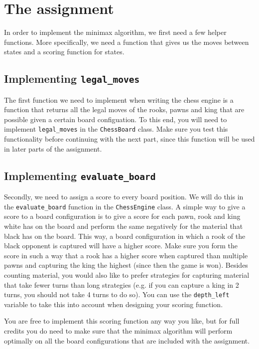\section*{The assignment}
In order to implement the minimax algorithm, we first need a few helper functions. More specifically, we need a function that gives us the moves between states and a scoring function for states.

\subsection{Implementing \texttt{legal\_moves}}
The first function we need to implement when writing the chess engine is a function that returns all the legal moves of the rooks, pawns and king that are possible given a certain board configuation. To this end, you will need to implement \texttt{legal\_moves} in the \texttt{ChessBoard} class. Make sure you test this functionality before continuing with the next part, since this function will be used in later parts of the assignment.

\subsection{Implementing \texttt{evaluate\_board}}
Secondly, we need to assign a score to every board position. We will do this in the \texttt{evaluate\_board} function in the \texttt{ChessEngine} class. A simple way to give a score to a board configuration is to give a score for each pawn, rook and king white has on the board and perform the same negatively for the material that black has on the board. This way, a board configuration in which a rook of the black opponent is captured will have a higher score. Make sure you form the score in such a way that a rook has a higher score when captured than multiple pawns and capturing the king the highest (since then the game is won).
Besides counting material, you would also like to prefer strategies for capturing material that take fewer turns than long strategies (e.g. if you can capture a king in 2 turns, you should not take 4 turns to do so). You can use the \texttt{depth\_left} variable to take this into account when designing your scoring function.

You are free to implement this scoring function any way you like, but for full credits you do need to make sure that the minimax algorithm will perform optimally on all the board configurations that are included with the assignment.

